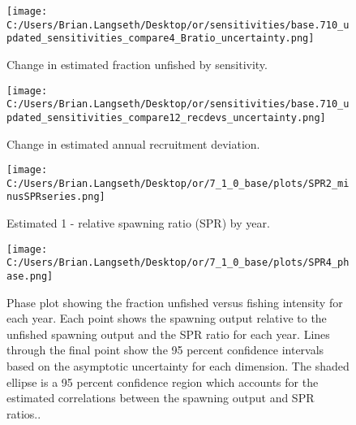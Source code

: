 \documentclass[11pt,
  english,
  a4paper,
]{article}
\begin{document}
\tagmcend\tagstructend


\begin{figure}
\centering
\texttt{[image: C:/Users/Brian.Langseth/Desktop/or/sensitivities/base.710\_updated\_sensitivities\_compare4\_Bratio\_uncertainty.png]}
\caption{Change in estimated fraction unfished by sensitivity.\label{fig:sens-depl}}
\end{figure}

\tagmcend\tagstructend


\begin{figure}
\centering
\texttt{[image: C:/Users/Brian.Langseth/Desktop/or/sensitivities/base.710\_updated\_sensitivities\_compare12\_recdevs\_uncertainty.png]}
\caption{Change in estimated annual recruitment deviation.\label{fig:sens-recdev}}
\end{figure}

\tagmcend\tagstructend


\begin{figure}
\centering
\texttt{[image: C:/Users/Brian.Langseth/Desktop/or/7\_1\_0\_base/plots/SPR2\_minusSPRseries.png]}
\caption{Estimated 1 - relative spawning ratio (SPR) by year.\label{fig:1-spr}}
\end{figure}

\tagmcend\tagstructend


\begin{figure}
\centering
\texttt{[image: C:/Users/Brian.Langseth/Desktop/or/7\_1\_0\_base/plots/SPR4\_phase.png]}
\caption{Phase plot showing the fraction unfished versus fishing intensity for each year. Each point shows the spawning output relative to the unfished spawning output and the SPR ratio for each year. Lines through the final point show the 95 percent confidence intervals based on the asymptotic uncertainty for each dimension. The shaded ellipse is a 95 percent confidence region which accounts for the estimated correlations between the spawning output and SPR ratios..\label{fig:phase-plot}}
\end{figure}
\end{document}
